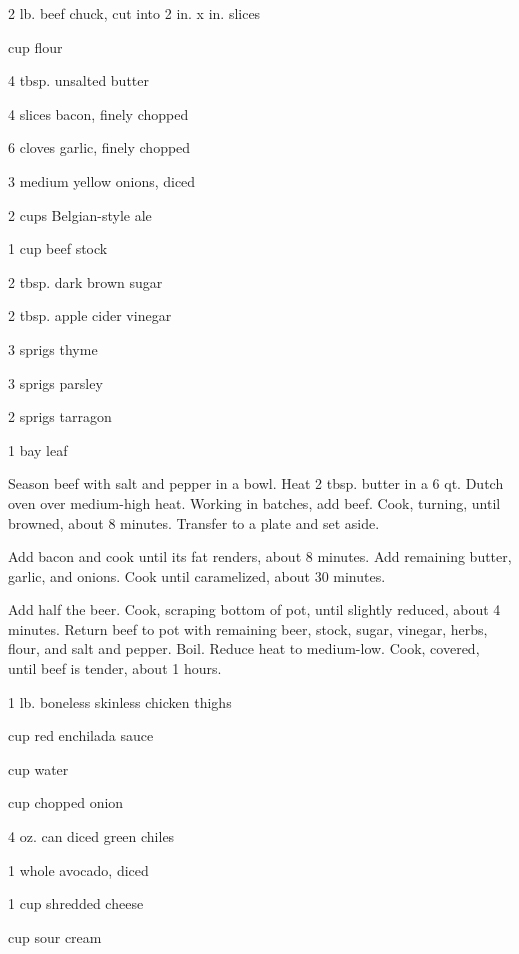 \documentclass{cookbook}
\begin{document}
\tableofcontents


\begin{ingredients}
    \item 2 lb. beef chuck, cut into 2 in. x  in. slices
    \item {} cup flour
    \item 4 tbsp. unsalted butter
    \item 4 slices bacon, finely chopped
    \item 6 cloves garlic, finely chopped
    \item 3 medium yellow onions, diced
    \item 2 cups Belgian-style ale
    \item 1 cup beef stock
    \item 2 tbsp. dark brown sugar
    \item 2 tbsp. apple cider vinegar
    \item 3 sprigs thyme
    \item 3 sprigs parsley
    \item 2 sprigs tarragon
    \item 1 bay leaf
\end{ingredients}

Season beef with salt and pepper in a bowl. Heat 2 tbsp. butter in a 6 qt. Dutch oven over medium-high heat. Working in batches, add beef. Cook, turning, until browned, about 8 minutes. Transfer to a plate and set aside.

Add bacon and cook until its fat renders, about 8 minutes. Add remaining butter, garlic, and onions. Cook until caramelized, about 30 minutes.

Add half the beer. Cook, scraping bottom of pot, until slightly reduced, about 4 minutes. Return beef to pot with remaining beer, stock, sugar, vinegar, herbs, flour, and salt and pepper. Boil. Reduce heat to medium-low. Cook, covered, until beef is tender, about 1  hours.


\begin{ingredients}
    \item 1 lb. boneless skinless chicken thighs
    \item {} cup red enchilada sauce
    \item {} cup water
    \item {} cup chopped onion
    \item 4 oz. can diced green chiles
    \item 1 whole avocado, diced
    \item 1 cup shredded cheese
    \item {} cup sour cream
\end{ingredients}
\end{document}
